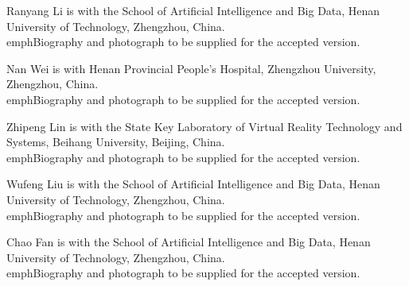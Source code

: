 \begin{IEEEbiographynophoto}{Ranyang Li}
is with the School of Artificial Intelligence and Big Data, Henan University
of Technology, Zhengzhou, China. \\emph{Biography and photograph to be supplied for the accepted version.}
\end{IEEEbiographynophoto}

\begin{IEEEbiographynophoto}{Nan Wei}
is with Henan Provincial People's Hospital, Zhengzhou University, Zhengzhou,
China. \\emph{Biography and photograph to be supplied for the accepted version.}
\end{IEEEbiographynophoto}

\begin{IEEEbiographynophoto}{Zhipeng Lin}
is with the State Key Laboratory of Virtual Reality Technology and Systems,
Beihang University, Beijing, China. \\emph{Biography and photograph to be supplied for the accepted version.}
\end{IEEEbiographynophoto}

\begin{IEEEbiographynophoto}{Wufeng Liu}
is with the School of Artificial Intelligence and Big Data, Henan University
of Technology, Zhengzhou, China. \\emph{Biography and photograph to be supplied for the accepted version.}
\end{IEEEbiographynophoto}

\begin{IEEEbiographynophoto}{Chao Fan}
is with the School of Artificial Intelligence and Big Data, Henan University
of Technology, Zhengzhou, China. \\emph{Biography and photograph to be supplied for the accepted version.}
\end{IEEEbiographynophoto}
